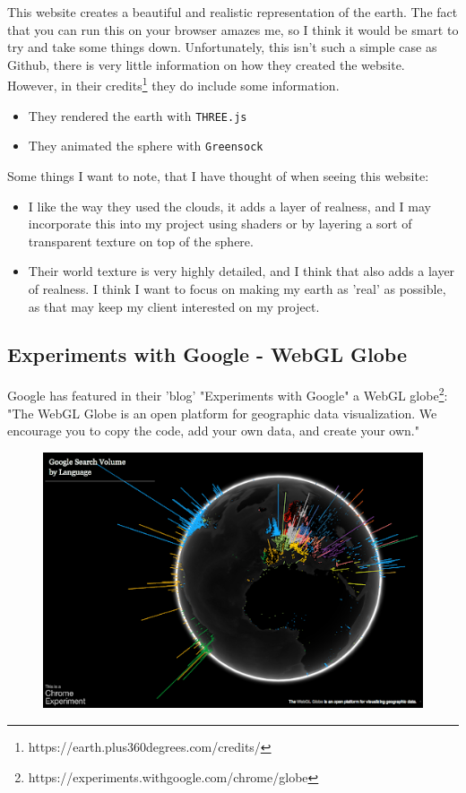 This website creates a beautiful and realistic representation of the earth. The fact that you can run this on your browser amazes me, so I think it would be smart to try and take some things down. Unfortunately, this isn't such a simple case as Github, there is very little information on how they created the website. However, in their credits\footnote{https://earth.plus360degrees.com/credits/} they do include some information.
\begin{itemize}
\item They rendered the earth with \verb|THREE.js|
\item They animated the sphere with \verb|Greensock|
\end{itemize}
Some things I want to note, that I have thought of when seeing this website:
\begin{itemize}
\item I like the way they used the clouds, it adds a layer of realness, and I may incorporate this into my project using shaders or by layering a sort of transparent texture on top of the sphere.
\item Their world texture is very highly detailed, and I think that also adds a layer of realness. I think I want to focus on making my earth as 'real' as possible, as that may keep my client interested on my project.
\end{itemize}

\newpage

\subsection{Experiments with Google - WebGL Globe}
Google has featured in their 'blog' "Experiments with Google" a WebGL globe\footnote{https://experiments.withgoogle.com/chrome/globe}: "The WebGL Globe is an open platform for geographic data visualization. We encourage you to copy the code, add your own data, and create your own." \\
\begin{figure}[h]
\centering
\includegraphics[width=0.7\linewidth]{images/screenshot003}
\caption{}
\label{fig:screenshot003}
\end{figure}

